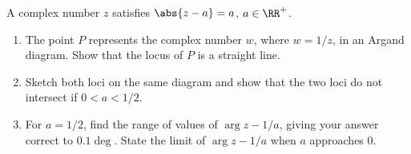 \begin{problem}
    A complex number $z$ satisfies $\abs{z - a} = a$, $a \in \RR^+$.

    \begin{enumerate}
        \item The point $P$ represents the complex number $w$, where $w = 1/z$, in an Argand diagram. Show that the locus of $P$ is a straight line.
        \item Sketch both loci on the same diagram and show that the two loci do not intersect if $0 < a < 1/2$.
        \item For $a = 1/2$, find the range of values of $\arg{z - 1/a}$, giving your answer correct to $0.1\deg$. State the limit of $\arg{z - 1/a}$ when $a$ approaches 0.
    \end{enumerate}
\end{problem}
